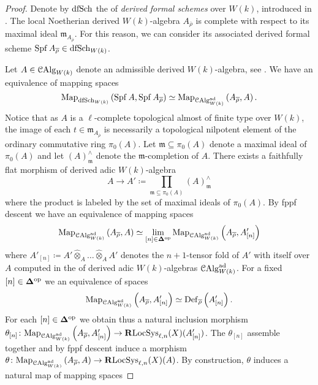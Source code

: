 \documentclass[10pt,a4paper]{amsart}
\numberwithin{equation}{subsection}
\theoremstyle{plain}
\theoremstyle{definition}
\theoremstyle{remark}
\numberwithin{equation}{section}
\begin{document}
\begin{proof}
Denote by $\mathrm{dfSch}$ the \infcat of \emph{derived formal schemes} over $W(k)$, introduced in \cite[section 2.8]{lurieSAG}.
The local Noetherian derived $W(k)$-algebra $A_{\overline{\rho}}$ is complete with respect to its maximal ideal $\mathfrak m_{A_{\overline{\rho}}}$. For this reason, we can consider its associated derived formal scheme $\operatorname{Spf} A_{\overline{\rho}} \in 
\mathrm{dfSch}_{W(k)}$.

Let $A \in \mathcal{C}\mathrm{Alg}^{}_{W(k)}$ denote an admissible derived $W(k)$-algebra, see \cite[Definition 3.1.1]{me2}. We have an equivalence of mapping spaces
	\[
		\mathrm{Map}_{\mathrm{dfSch}_{W(k)}} \left( \operatorname{Spf} A, \operatorname{Spf} A_{\overline{\rho}} \right) \simeq \mathrm{Map}_{\mathcal{C}\mathrm{Alg}_{W(k)}^{\mathrm{ad}}} \left( A_{\overline{\rho}}, A \right).
	\]
Notice that as $A$ is a $\ell$-complete topological almost of finite type over $W(k)$, the image of each $t \in \mathfrak m_{A_{\overline{\rho}}}$ is necessarily a topological nilpotent element of the ordinary commutative ring $\pi_0(A)$.
Let $\mathfrak m \subseteq \pi_0(A)$ denote a maximal ideal of $\pi_0(A)$ and let $\left( A\right)^{\wedge}_{\mathfrak{m}}$ denote the $\mathfrak m$-completion of $A$.
There exists a faithfully flat morphism of derived adic $W(k)$-algebra
	\[
		A \to A' \coloneqq \prod_{\mathfrak m \subseteq \pi_0(A)} 	\left( A \right)^\wedge_{\mathfrak{m}}
	\]
where the product is labeled by the set of maximal ideals of $\pi_0(A)$. By fppf descent we have an equivalence of mapping spaces
	\begin{equation} \label{ffdes}
		 \mathrm{Map}_{\mathcal{C}\mathrm{Alg}^{\mathrm{ad}}_{W(k)}} \left( A_{\overline{\rho}}, A \right) \simeq \lim_{[n] \in \mathbf \Delta^{\mathrm{op}}} \mathrm{Map}_{\mathcal{C}\mathrm{Alg}_{W(k)}^{\mathrm{ad}}} \left( A_{\overline{\rho}}, A'_{[n]} \right) 
	\end{equation}
where $A'_{[n]} \coloneqq A' \widehat{\otimes}_A \dots \widehat{\otimes}_A A'$ denotes the $n+1$-tensor fold of $A'$ with itself over $A$ computed in the \infcat of derived adic $W(k)$-algebras $\mathcal{C}\mathrm{Alg}_{W(k)}^{\mathrm{ad}}$.
For a fixed $[n] \in \mathbf \Delta^{\mathrm{op}}$ we an equivalence of spaces
	\[
		\mathrm{Map}_{\mathcal{C}\mathrm{Alg}^{\mathrm{ad}}_{W(k)} } \left( A_{\overline{\rho}}, A'_{[n]} \right) \simeq
		  \mathbf{\mathrm{Def}}_{\overline{\rho}} \left( A'_{[n]} \right).
	\]
For each $[n] \in \mathbf \Delta^{\mathrm{op}}$ we obtain thus a natural inclusion morphism $\theta_{[n]} \colon \mathrm{Map}_{\mathcal{C}\mathrm{Alg}^{\mathrm{ad}}_{W(k)}} \left( A_{\overline{\rho}}, A'_{[n]} \right) \to \mathbf R \mathrm{LocSys}_{\ell, n}(X)(A'_{[n]})$.  The $\theta_{[n]}$ assemble together and by fppf descent induce
a morphism $\theta \colon \mathrm{Map}_{\mathcal{C}\mathrm{Alg}^{\mathrm{ad}}_{W(k)}} \left( A_{\overline{\rho}}, A \right) \to \mathbf R \mathrm{LocSys}_{\ell, n}(X) (A)$. By construction, $\theta$ induces a natural map of mapping spaces	

\end{proof}
\end{document}
